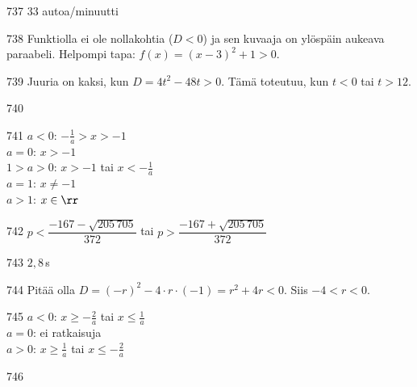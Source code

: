 \begin{Vastaus}{737}
        $33$ autoa/minuutti
    
\end{Vastaus}
\begin{Vastaus}{738}
	Funktiolla ei ole nollakohtia ($D<0$) ja sen kuvaaja on ylöspäin aukeava paraabeli.
    Helpompi tapa: $f(x)= (x-3)^2+1 >0.$
    
\end{Vastaus}
\begin{Vastaus}{739}
		Juuria on kaksi, kun $D=4t^2-48t>0$. Tämä toteutuu, kun $t < 0$ tai $t > 12$.
	
\end{Vastaus}
\begin{Vastaus}{740}
    
\end{Vastaus}
\begin{Vastaus}{741}
        $a < 0$: $-\frac{1}{a} > x > -1$ \\ $a = 0$: $x > -1$ \\ $1 > a > 0$: $x > -1$ tai $x < -\frac{1}{a}$ \\ $a = 1$: $x \neq -1$ \\ $a > 1$: $x \in \rr$
    
\end{Vastaus}
\begin{Vastaus}{742}
        $p<\dfrac{-167-\sqrt{205\,705}}{372}$ tai $p>\dfrac{-167+\sqrt{205\,705}}{372}$
    
\end{Vastaus}
\begin{Vastaus}{743}
	$2,8$\,s
    
\end{Vastaus}
\begin{Vastaus}{744}
		Pitää olla $D=(-r)^2-4 \cdot r \cdot (-1)=r^2+4r<0$. Siis $-4 < r < 0$.
	
\end{Vastaus}
\begin{Vastaus}{745}
        $a < 0$: $x \geq -\frac{2}{a}$ tai $x \leq \frac{1}{a}$ \\ $a = 0$: ei ratkaisuja \\ $a > 0$: $x \geq \frac{1}{a}$ tai $x \leq -\frac{2}{a}$
    
\end{Vastaus}
\begin{Vastaus}{746}
	
\end{Vastaus}
